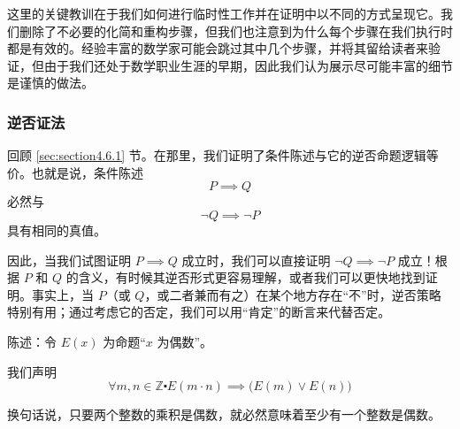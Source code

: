 这里的关键教训在于我们如何进行临时性工作并在证明中以不同的方式呈现它。我们删除了不必要的化简和重构步骤，但我们也注意到为什么每个步骤在我们执行时都是有效的。经验丰富的数学家可能会跳过其中几个步骤，并将其留给读者来验证，但由于我们还处于数学职业生涯的早期，因此我们认为展示尽可能丰富的细节是谨慎的做法。

\subsubsection*{逆否证法}

回顾 \ref{sec:section4.6.1} 节。在那里，我们证明了条件陈述与它的逆否命题逻辑等价。也就是说，条件陈述
\[P \implies Q\]
必然与
\[\neg Q \implies \neg P\]
具有相同的真值。

因此，当我们试图证明 $P \implies Q$ 成立时，我们可以直接证明 $\neg Q \implies \neg P$ 成立！根据 $P$ 和 $Q$ 的含义，有时候其逆否形式更容易理解，或者我们可以更快地找到证明。事实上，当 $P$（或 $Q$，或二者兼而有之）在某个地方存在``不''时，逆否策略特别有用；通过考虑它的否定，我们可以用``肯定''的断言来代替否定。

\begin{center}
    \noindent {}
\end{center}

\begin{example}[偶数的乘积]

    陈述：令 $E(x)$ 为命题``$x$ 为偶数''。

    我们声明
    \[\forall m,n \in \mathbb{Z} \centerdot E(m \cdot n) \implies \big(E(m) \lor E(n)\big)\]

    换句话说，只要两个整数的乘积是偶数，就必然意味着至少有一个整数是偶数。
\end{example}

